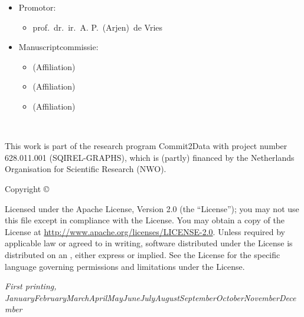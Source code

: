 \documentclass{tufte-book} %
\newcommand{\monthyear}{\ifcase\month\or January\or February\or March\or April\or May\or June\or July\or August\or September\or October\or November\or December\fi\space\number\year} %
\begin{document}
\begin{fullwidth}
	\begin{itemize}[leftmargin=*]
		\item[] Promotor:
		\begin{itemize}
			\item[] prof.\ dr.\ ir.\ A. P.\ (Arjen)\ de Vries
		\end{itemize}
	\end{itemize}
	
	\begin{itemize}[leftmargin=*]
		\item[] Manuscriptcommissie:
		\begin{itemize}
			\item[]  (Affiliation)
			\item[]  (Affiliation)
			\item[]  (Affiliation)
		\end{itemize}
	\end{itemize}
	~\vfill
	\thispagestyle{empty}
	\setlength{\parindent}{0pt}
	\setlength{\parskip}{\baselineskip}
	
	\par This work is part of the research program Commit2Data with project number 628.011.001 (SQIREL-GRAPHS), which is (partly) financed by the Netherlands Organisation for Scientific Research (NWO).

	
	Copyright \copyright\ \the\year\ \thanklessauthor
	
	\par{}
	
	\par Licensed under the Apache License, Version 2.0 (the ``License''); you may not use this file except in compliance with the License. You may obtain a copy of the License at \url{http://www.apache.org/licenses/LICENSE-2.0}. Unless required by applicable law or agreed to in writing, software distributed under the License is distributed on an , either express or implied. See the License for the specific language governing permissions and limitations under the License.
	
	\par\textit{First printing, \monthyear}
\end{fullwidth}

\frontmatter
\end{document}
